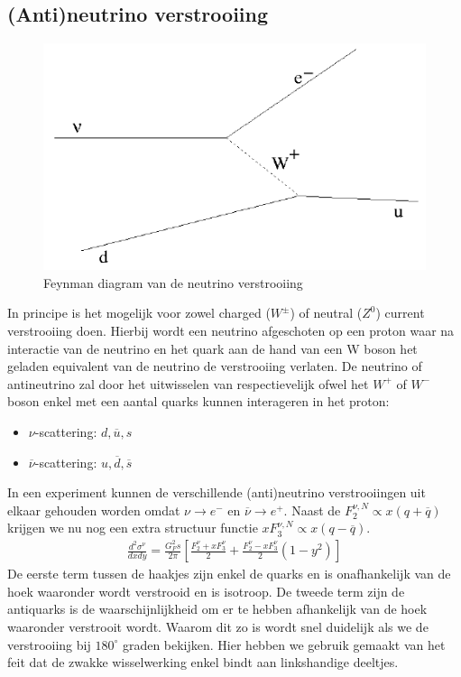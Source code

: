 \documentclass[../main.tex]{subfiles}
\begin{document}
\subsection{(Anti)neutrino verstrooiing}%
\label{sub:_anti_neutrino_verstrooiing}

\begin{figure}[h]
    \centering
    \includegraphics[width=0.8\linewidth]{DIS_nucleon_structuur_pdf/neutrino_scat.png}
    \caption{Feynman diagram van de neutrino verstrooiing}%
    \label{fig:neutrino_scat}
\end{figure}

In principe is het mogelijk voor zowel charged ($W^\pm$) of neutral ($Z^0$) current verstrooiing doen. Hierbij wordt een neutrino afgeschoten op een proton waar na interactie van de neutrino en het quark aan de hand van een W boson het geladen equivalent van de neutrino de verstrooiing verlaten. De neutrino of antineutrino zal door het uitwisselen van respectievelijk ofwel het $W^+$ of $W^-$ boson enkel met een aantal quarks kunnen interageren in het proton:
\begin{itemize}
    \item $\nu$-scattering: $d,\overline u,s$
    \item $\overline \nu$-scattering: $u,\overline d,\overline s$
\end{itemize}
In een experiment kunnen de verschillende (anti)neutrino verstrooiingen uit elkaar gehouden worden omdat $\nu \rightarrow e^-$ en $\overline \nu \rightarrow e^+$. Naast de $F_2^{\nu,N}\propto x(q+\overline q)$ krijgen we nu nog een extra structuur functie $xF_3^{\nu,N}\propto x(q-\overline q)$.
\begin{equation}
    \begin{aligned}
        \label{eq:struct_func_nucleon_zwak}
        \frac{d^2 \sigma^\nu}{dxdy} = \frac{G_F^2 s}{2\pi} \left[ \frac{F_2^\nu+xF_3^\nu}{2} + \frac{F_2^\nu-xF_3^\nu}{2}(1-y^2) \right]
    \end{aligned}
\end{equation}
De eerste term tussen de haakjes zijn enkel de quarks en is onafhankelijk van de hoek waaronder wordt verstrooid en is isotroop. De tweede term zijn de antiquarks is de waarschijnlijkheid om er te hebben afhankelijk van de hoek waaronder verstrooit wordt. Waarom dit zo is wordt snel duidelijk als we de verstrooiing bij $180^\circ$ graden bekijken. Hier hebben we gebruik gemaakt van het feit dat de zwakke wisselwerking enkel bindt aan linkshandige deeltjes.
\end{document}
